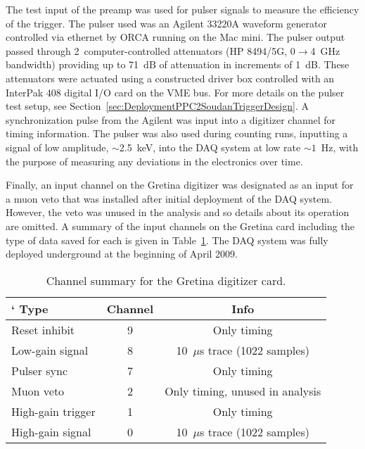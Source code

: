 	The test input of the preamp was used for pulser signals to measure the efficiency of the trigger.  The pulser used was an Agilent 33220A waveform generator controlled via ethernet by ORCA running on the Mac mini.  The pulser output passed through 2~computer-controlled attenuators (HP 8494/5G, 0$\to$4~GHz bandwidth) providing up to 71~dB of attenuation in increments of 1~dB.  These attenuators were actuated using a constructed driver box controlled with an InterPak 408 digital I/O card on the VME bus.  For more details on the pulser test setup, see Section~\ref{sec:DeploymentPPC2SoudanTriggerDesign}.  A synchronization pulse from the Agilent was input into a digitizer channel for timing information.  The pulser was also used during counting runs, inputting a signal of low amplitude, $\sim$2.5~keV, into the DAQ system at low rate $\sim1$~Hz, with the purpose of measuring any deviations in the electronics over time.
		     
	Finally, an input channel on the Gretina digitizer was designated as an input for a muon veto that was installed after initial deployment of the DAQ system.  However, the veto was unused in the analysis and so details about its operation are omitted.  A summary of the input channels on the Gretina card including the type of data saved for each is given in Table~\ref{tab:PPC2DAQChannelInfo}.  
The DAQ system was fully deployed underground at the beginning of April 2009.
		 
			\begin{table}
				\centering
				\begin{tabular}{l c c}
					\toprule`
					Type & Channel &  Info \\
					\midrule
					Reset inhibit & 9 & Only timing \\
					Low-gain signal & 8 & 10~$\mu$s trace (1022	 samples) \\
					Pulser sync & 7 & Only timing \\
					Muon veto & 2 & Only timing, unused in analysis \\			
					High-gain trigger & 1 & Only timing \\
					High-gain signal & 0 & 10~$\mu$s trace (1022 samples) \\				
					\bottomrule
				\end{tabular}
				\caption[Channel summary for the Gretina digitizer card]
				{Channel summary for the Gretina digitizer card.  }
				\label{tab:PPC2DAQChannelInfo}
			\end{table}	     
	
